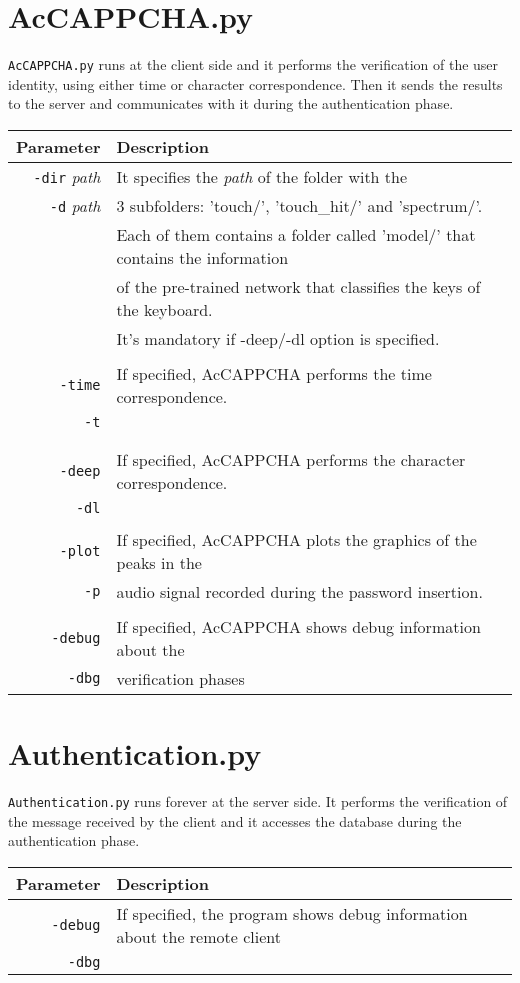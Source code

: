 \section{AcCAPPCHA.py}
\texttt{AcCAPPCHA.py} runs at the client side and it performs the verification of the user identity, using either time or character correspondence. Then it sends the results to the server and communicates with it during the authentication phase.

{\footnotesize
\begin{longtable}{rl}
\hline
\textbf{Parameter} & \textbf{Description}\\
\hline
\texttt{-dir} \textit{path} & It specifies the \textit{path} of the folder with the\\
\texttt{-d} \textit{path} & 3 subfolders: 'touch/', 'touch\_hit/' and 'spectrum/'.\\
& Each of them contains a folder called 'model/' that contains the information\\
& of the pre-trained network that classifies the keys of the keyboard.\\
& It's mandatory if -deep/-dl option is specified.\\
&\\
\texttt{-time} & If specified, AcCAPPCHA performs the time correspondence.\\
\texttt{-t} & \\
&\\
&\\
\texttt{-deep} & If specified, AcCAPPCHA performs the character correspondence.\\
\texttt{-dl} & \\
&\\
\texttt{-plot} & If specified, AcCAPPCHA plots the graphics of the peaks in the\\
\texttt{-p} & audio signal recorded during the password insertion.\\
&\\
\texttt{-debug} & If specified, AcCAPPCHA shows debug information about the\\
\texttt{-dbg} & verification phases\\
\hline
\end{longtable}}

\section{Authentication.py}
\texttt{Authentication.py} runs forever at the server side. It performs the verification of the message received by the client and it accesses the database during the authentication phase.
\begin{table}[h]
\centering\footnotesize
\begin{tabular}{rl}
\hline
\textbf{Parameter} & \textbf{Description}\\
\hline
\texttt{-debug} & If specified, the program shows debug information about the remote client\\
\texttt{-dbg} &\\
\hline
\end{tabular}
\end{table}